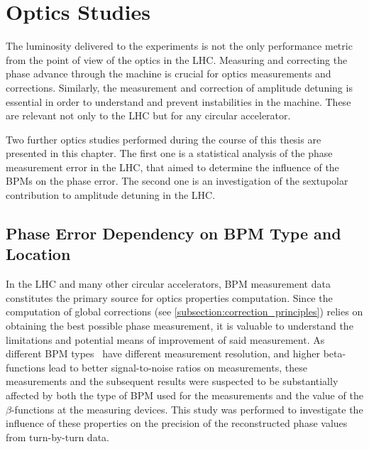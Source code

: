 \chapter{Optics Studies}
\label{chapter:others_and_software}

The \gls{luminosity} delivered to the \glspl{experiment} is not the only performance metric from the point of view of the \gls{optics} in the \gls{LHC}.
Measuring and correcting the phase advance through the machine is crucial for optics measurements and corrections.
Similarly, the measurement and correction of amplitude detuning is essential in order to understand and prevent instabilities in the machine.
These are relevant not only to the \gls{LHC} but for any circular accelerator.

Two further optics studies performed during the course of this thesis are presented in this chapter.
The first one is a statistical analysis of the phase measurement error in the \gls{LHC}, that aimed to determine the influence of the \glspl{BPM} on the phase error.
The second one is an investigation of the sextupolar contribution to amplitude detuning in the \gls{LHC}.


\section{Phase Error Dependency on BPM Type and Location}
\label{section:phase_error_dependency_on_bpm_type_and_location}

In the \gls{LHC} and many other circular accelerators, \gls{BPM} measurement data constitutes the primary source for \gls{optics} properties computation.
Since the computation of global corrections (see \cref{subsection:correction_principles}) relies on obtaining the best possible phase measurement, it is valuable to understand the limitations and potential means of improvement of said measurement.
As different BPM types~\cite{CERN:Equipment_Codes} have different measurement resolution, and higher \glspl{beta-function} lead to better signal-to-noise ratios on measurements, these measurements and the subsequent results were suspected to be substantially affected by both the type of BPM used for the measurements and the value of the \(\beta\)-functions at the measuring devices.
This study was performed to investigate the influence of these properties on the precision of the reconstructed phase values from turn-by-turn data.

